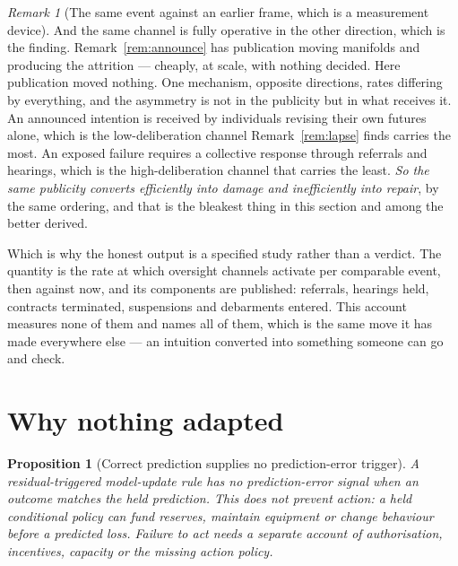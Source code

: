 \documentclass[11pt,a4paper]{article}
\newtheorem{proposition}[definition]{Proposition}
\theoremstyle{remark}
\newtheorem{remark}[definition]{Remark}
\begin{document}
\begin{remark}[The same event against an earlier frame, which is a measurement device]
And the same channel is fully operative in the other direction, which is the finding.
Remark~\ref{rem:announce} has publication moving manifolds and producing the attrition --- cheaply, at
scale, with nothing decided. Here publication moved nothing. One mechanism, opposite directions,
rates differing by everything, and the asymmetry is not in the publicity but in what receives it. An
announced intention is received by individuals revising their own futures alone, which is the
low-deliberation channel Remark~\ref{rem:lapse} finds carries the most. An exposed failure requires a
collective response through referrals and hearings, which is the high-deliberation channel that carries
the least. \emph{So the same publicity converts efficiently into damage and inefficiently into repair},
by the same ordering, and that is the bleakest thing in this section and among the better derived.

Which is why the honest output is a specified study rather than a verdict. The quantity is the
rate at which oversight channels activate per comparable event, then against now, and its components are
published: referrals, hearings held, contracts terminated, suspensions and debarments entered. This
account measures none of them and names all of them, which is the same move it has made everywhere
else --- an intuition converted into something someone can go and check.
\end{remark}

\section{Why nothing adapted}\label{sec:noadapt}
\begin{proposition}[Correct prediction supplies no prediction-error trigger]\label{prop:blind-to-predicted}
A residual-triggered model-update rule has no prediction-error signal when
an outcome matches the held prediction. This does not prevent action:
a held conditional policy can fund reserves, maintain equipment or change
behaviour before a predicted loss. Failure to act needs a separate account
of authorisation, incentives, capacity or the missing action policy.
\end{proposition}
\end{document}
